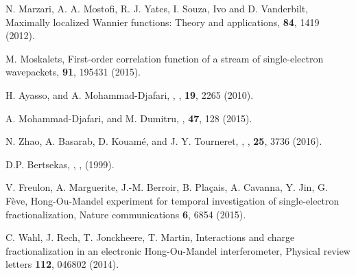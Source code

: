 \documentclass[aps,prb,superscriptaddress,preprint]{revtex4-1}
\begin{document}
\begin{thebibliography}{1}
		N. Marzari, A. A. Mostofi, R. J. Yates, I. Souza, Ivo and D. Vanderbilt,
		\newblock Maximally localized Wannier functions: Theory and applications,
		 {\bf 84}, 1419 (2012).
		
		M. Moskalets,
		\newblock First-order correlation function of a stream of single-electron wavepackets,
		 {\bf 91}, 195431 (2015).
		
		H. Ayasso, and A. Mohammad-Djafari, , , {\bf 19}, 2265 (2010).
		
		A. Mohammad-Djafari, and M. Dumitru,  ,   {\bf 47}, 128 (2015).
		
		N. Zhao, A. Basarab, D. Kouam\'{e}, and J. Y. Tourneret,  , , {\bf 25}, 3736 (2016).
		
		D.P. Bertsekas, , , (1999).
		
		V. Freulon, A. Marguerite, J.-M. Berroir, B. Pla\c{c}ais, A. Cavanna, Y. Jin, G. F\`{e}ve, Hong-Ou-Mandel experiment for temporal investigation of single-electron fractionalization, Nature communications {\bf 6}, 6854 (2015).
		
		C. Wahl, J. Rech, T. Jonckheere, T. Martin, Interactions and charge fractionalization in an electronic Hong-Ou-Mandel interferometer, Physical review letters {\bf 112}, 046802 (2014).
		
		
	\end{thebibliography}
	
	
	
\end{document}
